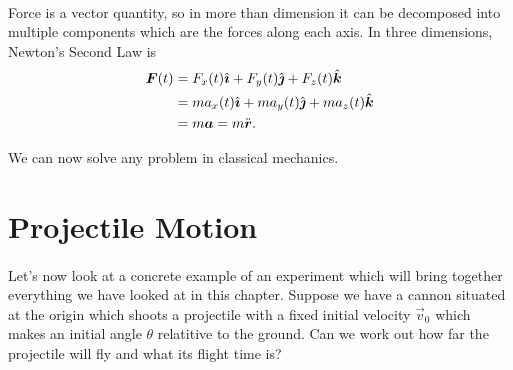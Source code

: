 \documentclass[../classical_mechanics.tex]{subfiles}
\begin{document}
        \paragraph{}
        Force is a vector quantity, so in more than dimension it can be decomposed into multiple components which are the forces along each axis.
        In three dimensions, Newton's Second Law is
        \begin{align}
            \boldsymbol{F}(t)&=F_x(t)\hat{\boldsymbol{\imath}}+F_y(t)\hat{\boldsymbol{\jmath}}+F_z(t)\hat{\boldsymbol{k}}\\
            &=ma_x(t)\hat{\boldsymbol{\imath}}+ma_y(t)\hat{\boldsymbol{\jmath}}+ma_z(t)\hat{\boldsymbol{k}} \\
            &=m\boldsymbol{a}=m\ddot{\boldsymbol{r}}.
        \end{align}

        We can now solve any problem in classical mechanics.

    \section{Projectile Motion}\label{sec:projectile-motion}
        \paragraph{}
        Let's now look at a concrete example of an experiment which will bring together everything we have looked at in this chapter.
        Suppose we have a cannon situated at the origin which shoots a projectile with a fixed initial velocity $\vec{v}_0$ which makes an initial angle $\theta$ relatitive to the ground.
        Can we work out how far the projectile will fly and what its flight time is?
\end{document}

